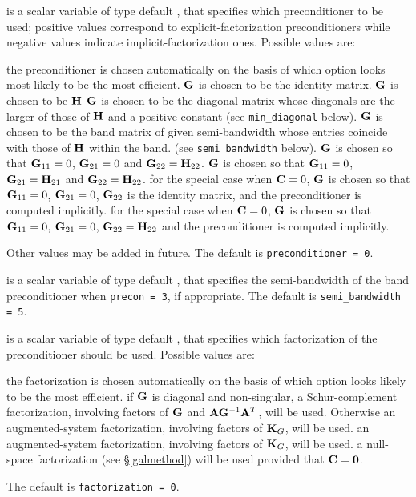 \documentclass{galahad}
\begin{document}
\begin{description}
 is a scalar variable of type default \integer,
that specifies which preconditioner to be used;
positive values correspond to explicit-factorization preconditioners
while negative values indicate implicit-factorization ones. Possible values are:

\begin{description}
 the preconditioner is chosen automatically on the basis of which option
        looks most likely to be the most efficient.
 ${\mathbf{G}}$ is chosen to be the identity matrix.
 ${\mathbf{G}}$ is chosen to be ${\mathbf{H}}$
 ${\mathbf{G}}$ is chosen to be the diagonal matrix whose diagonals
        are the larger of those of ${\mathbf{H}}$ and a positive constant
        (see {\tt min\_diagonal} below).
 ${\mathbf{G}}$ is chosen to be the band matrix  of given semi-bandwidth
        whose entries coincide with those of ${\mathbf{H}}$ within the band.
        (see {\tt semi\_bandwidth} below).
 ${\mathbf{G}}$ is chosen so that ${\mathbf{G}}_{11} = 0$, ${\mathbf{G}}_{21} = 0$
        and ${\mathbf{G}}_{22} = {\mathbf{H}}_{22}$.
 ${\mathbf{G}}$ is chosen so that ${\mathbf{G}}_{11} = 0$, ${\mathbf{G}}_{21} = {\mathbf{H}}_{21}$
        and ${\mathbf{G}}_{22} = {\mathbf{H}}_{22}$.
 for the special case when ${\mathbf{C}} = 0$,
        ${\mathbf{G}}$ is chosen so that ${\mathbf{G}}_{11} = 0$, ${\mathbf{G}}_{21} = 0$,
        ${\mathbf{G}}_{22}$ is the identity matrix, and the preconditioner is computed
        implicitly.
 for the special case when ${\mathbf{C}} = 0$,
        ${\mathbf{G}}$ is chosen so that ${\mathbf{G}}_{11} = 0$, ${\mathbf{G}}_{21} = 0$,
        ${\mathbf{G}}_{22} = {\mathbf{H}}_{22}$ and the preconditioner is computed
        implicitly.
\end{description}
Other values may be added in future.
The default is {\tt preconditioner = 0}.

 is a scalar variable of type default \integer, that
specifies the semi-bandwidth of the band preconditioner when {\tt precon = 3},
if appropriate.
The default is {\tt semi\_bandwidth = 5}.

 is a scalar variable of type default \integer, that
specifies which factorization of the preconditioner should be used.
Possible values are:

\begin{description}
 the factorization is chosen automatically on the basis of which option
        looks likely to be the most efficient.
 if ${\mathbf{G}}$ is diagonal and non-singular, a Schur-complement
        factorization, involving factors of ${\mathbf{G}}$ and ${\mathbf{A}} {\mathbf{G}}^{-1} {\mathbf{A}}^T$,
        will be used. Otherwise an augmented-system factorization, involving
        factors of ${\mathbf{K}}_G$, will be used.
 an augmented-system factorization, involving factors of ${\mathbf{K}}_G$,
        will be used.
 a null-space factorization (see \S\ref{galmethod}) will be used
provided that ${\mathbf{C}} = {\mathbf{0}}$.
\end{description}
The default is {\tt factorization = 0}.


\end{description}
\end{document}
